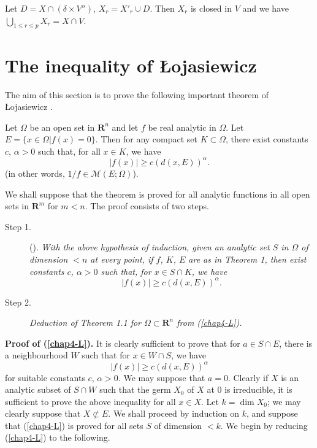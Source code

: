 Let $D = X \cap (\delta \times V'')$, $X_r = X'_r \cup D$. Then $X_r$ is closed in $V$ and we have $\bigcup\limits_{1 \leq r \leq p} X_r = X \cap V$.


\section{The inequality of \L ojasiewicz}\label{chap4-sec4}%

The aim of this section is to prove the following important theorem of {\L}ojasiewicz \cite{S. Lojasiewicz : 1}.

\begin{theorem}\label{chap4-thm4.1}%
  Let $\Omega$ be an open set in $\mathbf{R}^n$ and let $f$ be real analytic in $\Omega$. Let $E = \{x \in \Omega |f(x) =0\}$. Then for any compact set $K \subset \Omega$, there exist constants $c$, $\alpha > 0$ such that, for all $x \in K$, we have
  $$
  |f(x)| \geq c(d(x, E))^\alpha .
  $$
   (in other words, $1/f \in \mathscr{M}(E;\Omega)$).
\end{theorem}

We shall suppose that the theorem is proved for all analytic functions in all open sets in $\mathbf{R}^m$ for $m<n$. The proof consists of two steps.

\begin{description}
  \item[Step 1.]  ().\label{chap4-L} \textit{With the above hypothesis of induction, given an analytic set $S$ in $\Omega$ of dimension $< n$ at every point, if $f$, $K$, $E$ are as in Theorem 1, then exist constants $c$, $\alpha > 0$ such that, for $x \in S \cap K$, we have}
 $$
|f(x)| \geq c (d (x, E))^{\alpha}.
$$

\item[Step 2.] \textit{Deduction of Theorem 1.1 for $\Omega \subset \mathbf{R}^n$ from (\ref{chap4-L}).}
\end{description}

\medskip
\noindent
\textbf{Proof of (\ref{chap4-L}).}  It is clearly sufficient to prove that for $a \in S \cap E$, there is a neighbourhood $W$ such that for $x \in W \cap S$, we have
$$
|f(x)| \geq c (d(x, E))^\alpha 
$$
for suitable constants $c$, $\alpha > 0$. We may suppose that $a=0$. Clearly if $X$ is an analytic subset of $S \cap W$ such that the germ $X_0$ of $X$ at $0$ is irreducible, it is sufficient to prove the above inequality for all $x \in X$. Let $k = \dim X_0$; we may clearly suppose that $X \nsubset E$. We shall proceed by induction on $k$, and suppose that (\ref{chap4-L}) is proved for all sets $S$ of dimension $<k$. We begin by reducing (\ref{chap4-L}) to the following. 

